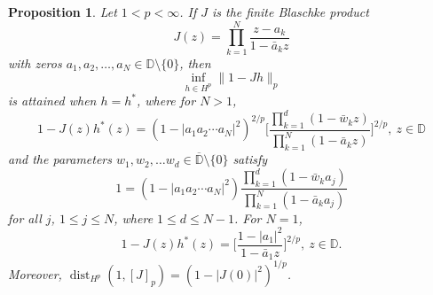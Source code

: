 \documentclass{article}
\theoremstyle{plain}
\numberwithin{Theorem}{section}
\numberwithin{equation}{section}
\theoremstyle{plain}
\newtheorem{Proposition}[Theorem]{Proposition}
\theoremstyle{definition}
\renewcommand{\leq}{\leqslant}
\begin{document}
\begin{Proposition}\label{Npoint}
       Let $1<p<\infty$. If  $J$ is the finite Blaschke product 
       \[
             J(z) = \prod_{k=1}^{N}\frac{ z - a_k }{ 1 - \bar{a}_k z }
       \]
       with zeros $a_1, a_2,\ldots, a_N\in \mathbb{D}\setminus\{0\}$,   then
       \[
            \inf_{h\in H^p}\|1 - Jh\|_p
       \] 
       is attained when $h = h^*$, where  for $ N> 1$,
    \begin{equation}\label{jstarform}
          1 - J(z)h^*(z)  =  (1 - |a_1 a_2 \cdots a_N|^2)^{2/p}  \Bigg[ \frac{\prod_{k=1}^{d}(1 - \bar{w}_k z)}{\prod_{k=1}^{N}(1 - \bar{a}_k z)}\Bigg]^{2/p},\ z \in \mathbb{D}
       \end{equation}
       and the parameters $w_1, w_2,\ldots w_d \in \overline{\mathbb{D}}\setminus \{0\}$ satisfy
       \begin{equation}\label{consconds}
            1 = (1 - |a_1 a_2 \cdots a_N|^2)\frac{\prod_{k=1}^{d}(1 - \bar{w}_k a_j)}{\prod_{k=1}^{N}(1 - \bar{a}_k a_j)}
       \end{equation}
       for all $j$, $1\leq j \leq N$, where $1 \leq d \leq N-1$. 
       For $N = 1$, \begin{equation}\label{jstarform1}
          1 - J(z)h^*(z)  =  \Bigg[ \frac{1 - |a_1|^2}{1 - \bar{a}_1 z}\Bigg]^{2/p},\ z \in \mathbb{D}.
       \end{equation}         
       Moreover, $\operatorname{dist}_{H^p} (1, [J]_p) = \left(1 - |J(0)|^2 \right)^{1/p}$.
       
\end{Proposition}
\end{document}
